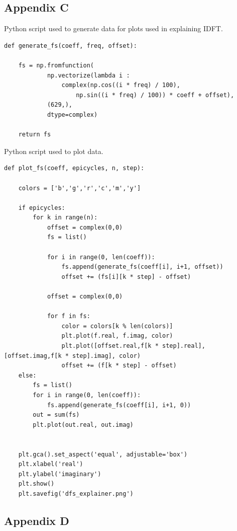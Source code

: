 \documentclass[titlepage]{article}
\begin{document}
\subsection{Appendix C}

    Python script used to generate data for plots used in explaining IDFT.

    \begin{verbatim}
def generate_fs(coeff, freq, offset):
    
    fs = np.fromfunction(
            np.vectorize(lambda i : 
                complex(np.cos((i * freq) / 100), 
                    np.sin((i * freq) / 100)) * coeff + offset),
            (629,), 
            dtype=complex)

    return fs
    \end{verbatim}

    Python script used to plot data.

    \begin{verbatim}
def plot_fs(coeff, epicycles, n, step):

    colors = ['b','g','r','c','m','y']

    if epicycles: 
        for k in range(n):
            offset = complex(0,0)
            fs = list()

            for i in range(0, len(coeff)):
                fs.append(generate_fs(coeff[i], i+1, offset))
                offset += (fs[i][k * step] - offset)

            offset = complex(0,0)

            for f in fs:
                color = colors[k % len(colors)]
                plt.plot(f.real, f.imag, color)
                plt.plot([offset.real,f[k * step].real], [offset.imag,f[k * step].imag], color)
                offset += (f[k * step] - offset)
    else:
        fs = list()
        for i in range(0, len(coeff)):
            fs.append(generate_fs(coeff[i], i+1, 0))
        out = sum(fs)
        plt.plot(out.real, out.imag)
        

    plt.gca().set_aspect('equal', adjustable='box')
    plt.xlabel('real')
    plt.ylabel('imaginary')
    plt.show()
    plt.savefig('dfs_explainer.png')

    \end{verbatim}

\subsection{Appendix D}
\end{document}
